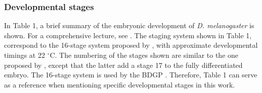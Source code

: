 \subsubsection{Developmental stages}

In Table 1, a brief summary of the embryonic development of \textit{D. melanogaster} is shown. For a comprehensive lecture, see \citep{Campos-Ortega1985,Roberts1998,Gilbert2014}.
%
The staging system shown in Table 1, correspond to the 16-stage system proposed by \citet{Roberts1998}, with approximate developmental timings at 22 $^\circ$C. 
The numbering of the stages shown are similar to the one proposed by \citet{Campos-Ortega1985}, except that the latter add a stage 17 to the fully differentiated embryo.
The 16-stage system is used by the BDGP \citep{Tomancak2002}. Therefore, Table 1 can serve as a reference when mentioning specific developmental stages in this work.


